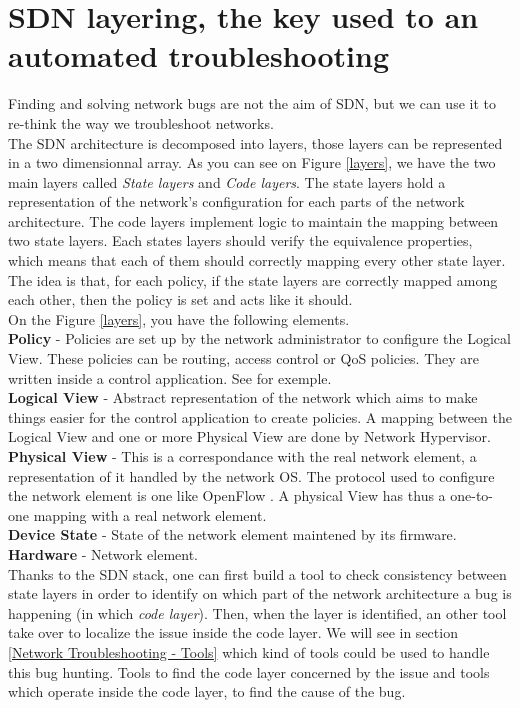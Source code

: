 \documentclass[10pt,article]{IEEEtran}
\begin{document}
\section{SDN layering, the key used to an automated troubleshooting}\label{layering}
Finding and solving network bugs are not the aim of SDN, but we can use it to re-think the way we troubleshoot networks.\\ The SDN architecture is decomposed into  layers, those layers can be represented in a two dimensionnal array. As you can see on Figure \ref{layers}, we have the two main layers called \textit{State layers} and \textit{Code layers}. The state layers hold a representation of the network's configuration for each parts of the network architecture. The code layers implement logic to maintain the mapping between two state layers. Each states layers should verify the equivalence properties, which means that each of them should correctly mapping every other state layer. The idea is that, for each policy, if the state layers are correctly mapped among each other, then the policy is  set and acts like it should.\\
On the Figure \ref{layers}, you have the following elements. \\
\textbf{Policy} - Policies are set up by the network administrator to configure the Logical View. These policies can be routing, access control or QoS policies. They are written inside a control application. See \cite{...} for exemple.
\\
\textbf{Logical View} - Abstract representation of the network which aims to make things easier for the control application to create policies. A mapping between the Logical View and one or more Physical View are done by Network Hypervisor.\\
\textbf{Physical View} - This is a correspondance with the real network element, a representation of it handled by the network OS. The protocol used to configure the network element is one like OpenFlow \cite{...https://www.opennetworking.org/}. A physical View has thus a one-to-one mapping with a real network element.
\\
\textbf{Device State} - State of the network element maintened by its firmware.
\\
\textbf{Hardware} - Network element. \\

Thanks to the SDN stack, one can first build a tool to check consistency between state layers in order to identify on which part of the network architecture a bug is happening (in which \textit{code layer}). Then, when the layer is identified, an other tool take over to localize the issue inside the code layer. We will see in section \ref{Network Troubleshooting - Tools} which kind of tools could be used to handle this bug hunting. Tools to find the code layer concerned by the issue and tools which operate inside the code layer, to find the cause of the bug.
\end{document}
